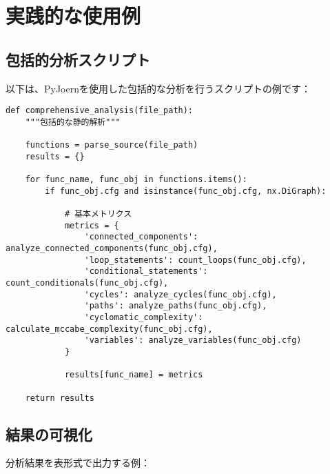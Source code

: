 \documentclass[12pt,a4paper]{article}
\begin{document}
\section{実践的な使用例}

\subsection{包括的分析スクリプト}

以下は、PyJoernを使用した包括的な分析を行うスクリプトの例です：

\begin{lstlisting}[caption=包括的分析の実装]
def comprehensive_analysis(file_path):
    """包括的な静的解析"""

    functions = parse_source(file_path)
    results = {}

    for func_name, func_obj in functions.items():
        if func_obj.cfg and isinstance(func_obj.cfg, nx.DiGraph):

            # 基本メトリクス
            metrics = {
                'connected_components': analyze_connected_components(func_obj.cfg),
                'loop_statements': count_loops(func_obj.cfg),
                'conditional_statements': count_conditionals(func_obj.cfg),
                'cycles': analyze_cycles(func_obj.cfg),
                'paths': analyze_paths(func_obj.cfg),
                'cyclomatic_complexity': calculate_mccabe_complexity(func_obj.cfg),
                'variables': analyze_variables(func_obj.cfg)
            }

            results[func_name] = metrics

    return results
\end{lstlisting}

\subsection{結果の可視化}

分析結果を表形式で出力する例：
\end{document}
